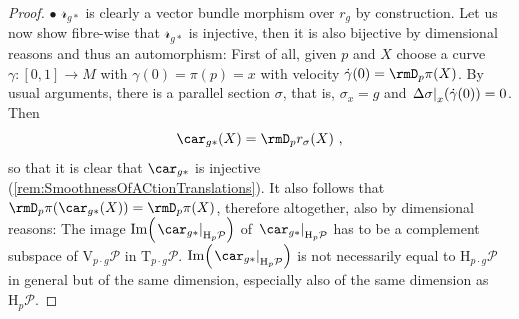 \documentclass[reqno,a4paper,oneside]{amsart}
\theoremstyle{plain}
\theoremstyle{remark}
\theoremstyle{definition}
\begin{document}
\begin{proof}
$\bullet$ $\mathcal{r}_{g*}$ is clearly a vector bundle morphism over $r_g$ by construction. Let us now show fibre-wise that $\mathcal{r}_{g*}$ is injective, then it is also bijective by dimensional reasons and thus an automorphism: First of all, given $p$ and $X$ choose a curve $\gamma\colon [0,1] \to M$ with $\gamma(0) = \pi(p) = x$ with velocity $\dot{\gamma}(0) = \rmD_p\pi(X)$. By usual arguments, there is a parallel section $\sigma$, that is, $\sigma_x=g$ and $\mleft.\Delta \sigma\mright|_x(\dot{\gamma}(0)) = 0$. Then 
\begin{equation*}
\car_{g*}(X) = \rmD_pr_\sigma(X)~,
\end{equation*}
so that it is clear that $\car_{g*}$ is injective (\ref{rem:SmoothnessOfACtionTranslations}). It also follows that $\rmD_{p}\pi(\car_{g*}(X)) = \rmD_{p}\pi(X)$, therefore altogether, also by dimensional reasons: The image $\mathrm{Im}\mleft( \mleft.\car_{g*}\mright|_{\mathrm{H}_p\mathcal{P}} \mright)$ of $\mleft.\car_{g*}\mright|_{\mathrm{H}_p\mathcal{P}}$ has to be a complement subspace of $\mathrm{V}_{p \cdot g}\mathcal{P}$ in $\mathrm{T}_{p \cdot g}\mathcal{P}$. $\mathrm{Im}\mleft( \mleft.\car_{g*}\mright|_{\mathrm{H}_p\mathcal{P}} \mright)$ is not necessarily equal to $\mathrm{H}_{p \cdot g}\mathcal{P}$ in general but of the same dimension, especially also of the same dimension as $\mathrm{H}_p \mathcal{P}$.
%

\end{proof}
\end{document}
